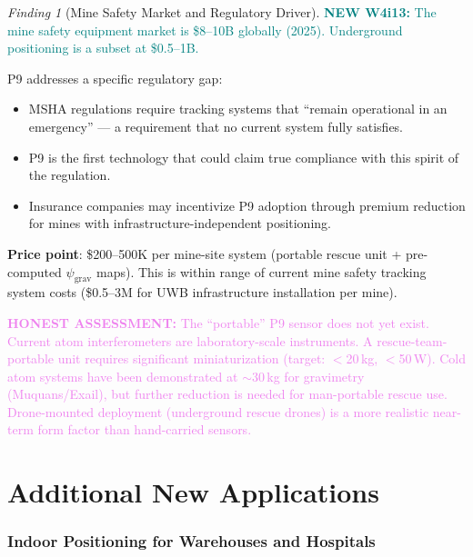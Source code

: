 \documentclass[11pt]{article}
\theoremstyle{definition}
\theoremstyle{remark}
\newtheorem{finding}[theorem]{Finding}
\newcommand{\psigrav}{\psi_{\mathrm{grav}}}
\newcommand{\honest}[1]{\textcolor{violet}{\textbf{HONEST ASSESSMENT:} #1}}
\newcommand{\newfinding}[1]{\textcolor{teal}{\textbf{NEW W4i13:} #1}}
\begin{document}
\begin{finding}[Mine Safety Market and Regulatory Driver]
\label{find:mine-market}
\newfinding{The mine safety equipment market is \$8--10B globally (2025).
Underground positioning is a subset at \$0.5--1B.}

P9 addresses a specific regulatory gap:
\begin{itemize}[nosep]
\item MSHA regulations require tracking systems that ``remain operational
  in an emergency'' --- a requirement that no current system fully
  satisfies.
\item P9 is the first technology that could claim true compliance with
  this spirit of the regulation.
\item Insurance companies may incentivize P9 adoption through premium
  reduction for mines with infrastructure-independent positioning.
\end{itemize}

\textbf{Price point}: \$200--500K per mine-site system (portable rescue
unit + pre-computed $\psigrav$ maps). This is within range of current
mine safety tracking system costs (\$0.5--3M for UWB infrastructure
installation per mine).
\end{finding}

\honest{The ``portable'' P9 sensor does not yet exist. Current atom
interferometers are laboratory-scale instruments. A rescue-team-portable
unit requires significant miniaturization (target: $<$20\,kg, $<$50\,W).
Cold atom systems have been demonstrated at $\sim$30\,kg for gravimetry
(Muquans/Exail), but further reduction is needed for man-portable
rescue use. Drone-mounted deployment (underground rescue drones) is
a more realistic near-term form factor than hand-carried sensors.}

\part{Additional New Applications}
\label{part:additional}

\section{Indoor Positioning for Warehouses and Hospitals}
\label{sec:indoor}
\end{document}
